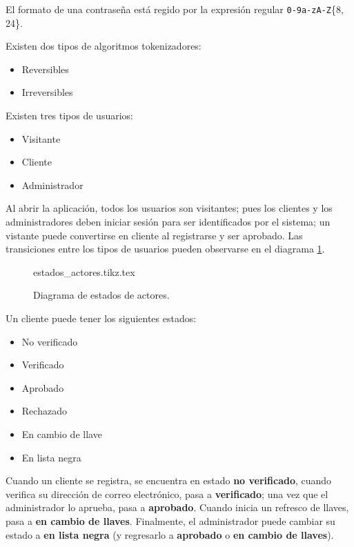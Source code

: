 
{
  El formato de una contraseña está regido por la expresión regular
  \texttt{0-9a-zA-Z}\{8, 24\}.
}

{
  Existen dos tipos de algoritmos tokenizadores:
  \begin{itemize}
    \item Reversibles
    \item Irreversibles
  \end{itemize}
}

{
  Existen tres tipos de usuarios:
  \begin{itemize}
    \item Visitante
    \item Cliente
    \item Administrador
  \end{itemize}

  Al abrir la aplicación, todos los usuarios son visitantes; pues los clientes
  y los administradores deben iniciar sesión para ser identificados por el
  sistema; un vistante puede convertirse en cliente al registrarse y ser
  aprobado. Las transiciones entre los tipos de usuarios pueden observarse en el
  diagrama \ref{estados_actores}.
}

\begin{figure}
  \begin{center}
    {estados_actores.tikz.tex}
    \caption{Diagrama de estados de actores.}
    \label{estados_actores}
  \end{center}
\end{figure}

{
  Un cliente puede tener los siguientes estados:
  \begin{itemize}
    \item No verificado
    \item Verificado
    \item Aprobado
    \item Rechazado
    \item En cambio de llave
    \item En lista negra
  \end{itemize}

  Cuando un cliente se registra, se encuentra en estado \textbf{no verificado},
  cuando verifica su dirección de correo electrónico, pasa a
  \textbf{verificado}; una vez que el administrador lo aprueba, pasa a
  \textbf{aprobado}. Cuando inicia un refresco de llaves, pasa a
  \textbf{en cambio de llaves}. Finalmente, el administrador puede cambiar su
  estado a \textbf{en lista negra} (y regresarlo a \textbf{aprobado} o
  \textbf{en cambio de llaves}).
}


